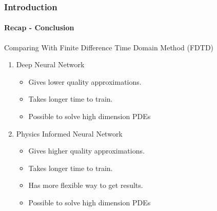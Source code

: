 \begin{frame}
  \frametitle{Introduction}
  \framesubtitle{Recap - Conclusion}
  \begin{block}{Comparing With Finite Difference Time Domain Method (FDTD)}
    \begin{enumerate}
      \item Deep Neural Network \cite{FIRST}
            \begin{itemize}
              \item Gives lower quality approximations.
              \item Takes longer time to train.
              \item Possible to solve high dimension PDEs \vspace*{1em}
            \end{itemize}
      \item Physics Informed Neural Network
            \begin{itemize}
              \item Gives higher quality approximations.
              \item Takes longer time to train.         
              \item Has more flexible way to get results.
              \item Possible to solve high dimension PDEs
            \end{itemize}
    \end{enumerate}    
  \end{block}
\end{frame}




